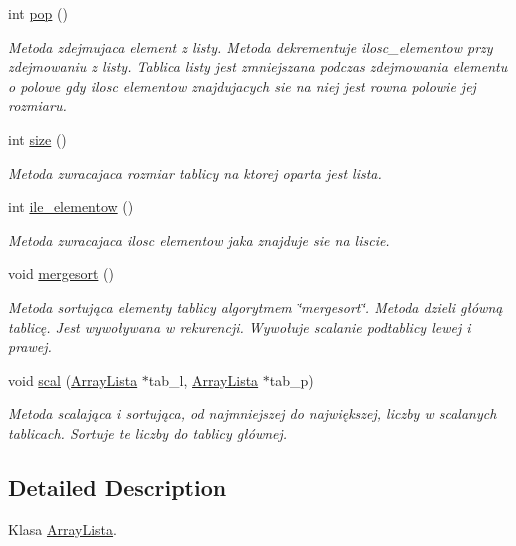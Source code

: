 \begin{DoxyCompactItemize}
int \hyperlink{a00001_ae76ea59ccac91abd264cf108489d3105}{pop} ()
\begin{DoxyCompactList}\small\item\em Metoda zdejmujaca element z listy. Metoda dekrementuje ilosc\+\_\+elementow przy zdejmowaniu z listy. Tablica listy jest zmniejszana podczas zdejmowania elementu o polowe gdy ilosc elementow znajdujacych sie na niej jest rowna polowie jej rozmiaru. \end{DoxyCompactList}\item 
int \hyperlink{a00001_abd7b74aa6ee7e7c1a454ec32b3aed86e}{size} ()
\begin{DoxyCompactList}\small\item\em Metoda zwracajaca rozmiar tablicy na ktorej oparta jest lista. \end{DoxyCompactList}\item 
int \hyperlink{a00001_a84f223e112fafe7c4d9abfc04609445a}{ile\+\_\+elementow} ()
\begin{DoxyCompactList}\small\item\em Metoda zwracajaca ilosc elementow jaka znajduje sie na liscie. \end{DoxyCompactList}\item 
void \hyperlink{a00001_a1f01993b86091134209948aa3be2b4fa}{mergesort} ()
\begin{DoxyCompactList}\small\item\em Metoda sortująca elementy tablicy algorytmem \char`\"{}mergesort\char`\"{}. Metoda dzieli główną tablicę. Jest wywoływana w rekurencji. Wywołuje scalanie podtablicy lewej i prawej. \end{DoxyCompactList}\item 
void \hyperlink{a00001_aea473d45482b6013779ffe61534826b9}{scal} (\hyperlink{a00001}{Array\+Lista} $\ast$tab\+\_\+l, \hyperlink{a00001}{Array\+Lista} $\ast$tab\+\_\+p)
\begin{DoxyCompactList}\small\item\em Metoda scalająca i sortująca, od najmniejszej do największej, liczby w scalanych tablicach. Sortuje te liczby do tablicy głównej. \end{DoxyCompactList}\end{DoxyCompactItemize}


\subsection{Detailed Description}
Klasa \hyperlink{a00001}{Array\+Lista}. 

